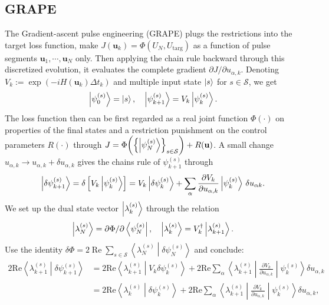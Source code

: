 \subsection{GRAPE}
The Gradient-ascent pulse engineering (GRAPE)  plugs the restrictions into the target loss function, make $J(\mathbf{u}_k)=\Phi(U_{N}, U_{\mathrm{targ}})$ as a function of pulse segments $\mathbf{u}_1,\cdots,\mathbf{u}_N$ only.
Then applying the chain rule backward through this discretized evolution,
it evaluates the complete gradient $\partial J/\partial u_{\alpha,k}$.
Denoting $V_k := \exp\left(-iH(\mathbf u_k) \Delta t_k\right)$ and multiple input state $\ket{s}$ for $s\in\mathcal S$, we get 
\begin{align}\label{eq:forward}
    \ket{\psi_0^{(s)}}=\ket{s},\quad \ket{\psi_{k+1}^{(s)}}=V_k\ket{\psi_k^{(s)}}.
\end{align}
The loss function then can be first regarded as a real joint function $\Phi(\cdot)$ on properties of the final states and a restriction punishment on the control parameters $R(\cdot)$
through $J=\Phi\!\left(\left\{\ket{\psi_N^{(s)}}\right\}_{s\in\mathcal S}\right) + R(\mathbf{u})$.
A small change $u_{\alpha, k} \to u_{\alpha, k}+\delta u_{\alpha, k}$ gives the chains rule of $\psi_{k+1}^{(s)}$ through
\begin{align}
 \ket{\delta\psi_{k+1}^{(s)}}
= \delta \left[V_k \ket{\psi_{k}^{(s)}}\right]
= V_k\ket{\delta\psi_k^{(s)}}
+ \sum_\alpha \frac{\partial V_k}{\partial u_{\alpha,k}} \ket{\psi_k^{(s)}}\, \delta u_{\alpha k}.
\end{align}
We set up the dual state vector $\ket{\lambda_k^{(s)}}$ through the relation
\begin{align}\label{eq:backward}
    \ket{\lambda_N^{(s)}}=\partial \Phi /\partial \bra{\psi_N^{(s)}}, \quad 
\ket{\lambda_k^{(s)}}=V_k^\dagger\ket{\lambda_{k+1}^{(s)}}.
\end{align}
Use the identity $\delta\Phi= 2\operatorname{Re} \sum_{s\in\mathcal S} \left\langle \lambda_N^{(s)} \middle|\delta\psi_N^{(s)}\right\rangle$ and conclude:
\begin{align}
    2\mathrm{Re}\left\langle\lambda_{k+1}^{(s)}\middle|\delta\psi_{k+1}^{(s)}\right\rangle
&=2\mathrm{Re}\left\langle\lambda_{k+1}^{(s)}\middle|V_k\delta\psi_k^{(s)}\right\rangle+
2\mathrm{Re}\sum_\alpha\left\langle\lambda_{k+1}^{(s)}\middle|\frac{\partial V_k}{\partial u_{\alpha,k}}\middle|\psi_k^{(s)}\right\rangle\delta u_{\alpha,k}\\
&=2\mathrm{Re}\left\langle\lambda_{k}^{(s)}\middle|\delta\psi_k^{(s)}\right\rangle+
2\mathrm{Re}\sum_\alpha\left\langle\lambda_{k+1}^{(s)}\middle|\frac{\partial V_k}{\partial u_{\alpha,k}}\middle|\psi_k^{(s)}\right\rangle\delta u_{\alpha,k},
\end{align}

